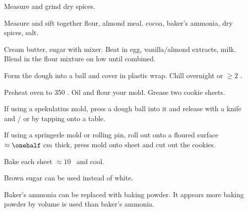 \begin{preparation}
\item Measure and grind dry spices.

\item Measure and sift together flour, almond meal, cocoa, baker's ammonia, dry spices, salt.

\item Cream butter, sugar with mixer.
	Beat in egg, vanilla/almond extracts, milk.
	Blend in the flour mixture on low until combined.

\item Form the dough into a ball and cover in plastic wrap.
	Chill overnight or $\ge 2$ \hour.

\item Preheat oven to 350 \Fahrenheit.
	Oil and flour your mold.
	Grease two cookie sheets.

\item If using a spekulatius mold, press a dough ball into it and release with a knife and / or by tapping onto a table.

\item If using a springerle mold or rolling pin, roll out onto a floured surface $\approx \onehalf~cm$ thick, press mold onto sheet and cut out the cookies.

\item Bake each sheet $\approx 10$ \minute~and cool.
\end{preparation}

\begin{variation}
\item Brown sugar can be used instead of white.
\end{variation}

\begin{experiments}
\item Baker's ammonia can be replaced with baking powder.
	It appears more baking powder by volume is used than baker's ammonia.
\end{experiments}


\recipeend%

